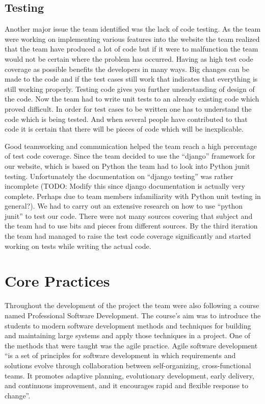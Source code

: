 \documentclass{l3proj}
\begin{document}
\subsection{Testing}
\label{sec:system-implementation:testing}

Another major issue the team identified was the lack of code testing. As the team were working on implementing various features into the website the team realized that the team have produced a lot of code but if it were to malfunction the team would not be certain where the problem has occurred. Having as high test code coverage as possible benefits the developers in many ways. Big changes can be made to the code and if the test cases still work that indicates that everything is still working properly. Testing code gives you further understanding of
design of the code. Now the team had to write unit tests to an already existing code which proved difficult. In order for test cases to be written one has to understand the code which is being tested. And when several people have contributed to that code it is certain that there will be pieces of code which will be inexplicable.

Good teamworking and communication helped the team reach a high percentage of test code coverage. Since the team decided to use the ``django'' framework for our website, which is based on Python the team had to look into Python junit testing. Unfortunately the documentation on ``django testing'' was rather incomplete (TODO: Modify this since django documentation is actually very complete. Perhaps due to team members infamiliarity with Python unit testing in general?). We had to carry out an extensive research on how to use ``python junit'' to test our code. There were not many sources covering that subject and the team had to use bits and pieces from different sources. By the third iteration the team had managed to raise the test code coverage significantly and started working on tests while writing the actual code.

\section{Core Practices}
\label {sec:core-practices}

Throughout the development of the project the team were also following a course named Professional Software Development.
The course's aim was to introduce the students to modern software development methods and techniques for building and
maintaining large systems and apply those techniques in a project. One of the methods that were taught
was the agile practice. Agile software development ``is a set of principles for software development in
which requirements and solutions evolve through collaboration between self-organizing, cross-functional teams.
It promotes adaptive planning, evolutionary development, early delivery, and continuous improvement, and it encourages
rapid and flexible response to change''.
\end{document}
